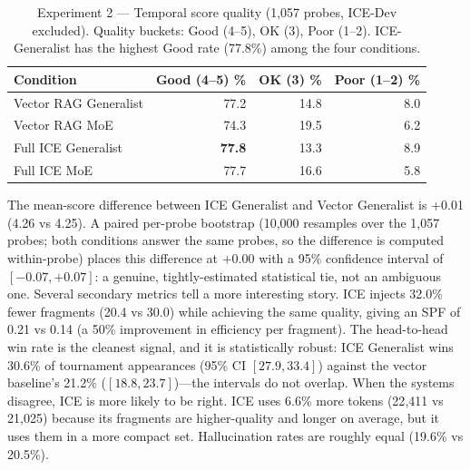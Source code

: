 \documentclass[10pt]{article}
\begin{document}
\begin{table}[htbp]
\centering
\small
\caption{Experiment 2 --- Temporal score quality (1,057 probes, ICE-Dev excluded). Quality buckets: Good (4--5), OK (3), Poor (1--2). ICE-Generalist has the highest Good rate (77.8\%) among the four conditions.}
\label{tab:exp2-temporal}
\begin{tabular}{lrrr}
\toprule
\textbf{Condition} & \textbf{Good (4--5) \%} & \textbf{OK (3) \%} & \textbf{Poor (1--2) \%} \\
\midrule
Vector RAG Generalist  & 77.2 & 14.8 & 8.0 \\
Vector RAG MoE         & 74.3 & 19.5 & 6.2 \\
Full ICE Generalist    & \textbf{77.8} & 13.3 & 8.9 \\
Full ICE MoE           & 77.7 & 16.6 & 5.8 \\
\bottomrule
\end{tabular}
\end{table}

The mean-score difference between ICE Generalist and Vector Generalist is +0.01 (4.26 vs 4.25). A paired per-probe bootstrap (10{,}000 resamples over the 1{,}057 probes; both conditions answer the same probes, so the difference is computed within-probe) places this difference at $+0.00$ with a 95\% confidence interval of $[-0.07, +0.07]$: a genuine, tightly-estimated statistical tie, not an ambiguous one. Several secondary metrics tell a more interesting story. ICE injects 32.0\% fewer fragments (20.4 vs 30.0) while achieving the same quality, giving an SPF of 0.21 vs 0.14 (a 50\% improvement in efficiency per fragment). The head-to-head win rate is the cleanest signal, and it is statistically robust: ICE Generalist wins 30.6\% of tournament appearances (95\% CI $[27.9, 33.4]$) against the vector baseline's 21.2\% ($[18.8, 23.7]$)---the intervals do not overlap. When the systems disagree, ICE is more likely to be right. ICE uses 6.6\% more tokens (22{,}411 vs 21{,}025) because its fragments are higher-quality and longer on average, but it uses them in a more compact set. Hallucination rates are roughly equal (19.6\% vs 20.5\%).
\end{document}

